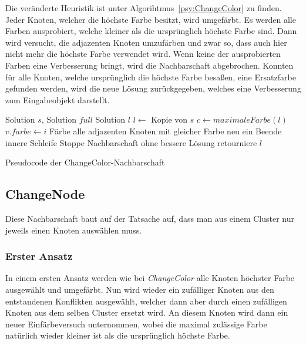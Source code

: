 Die veränderte Heuristik ist unter Algorihtmus~\ref{psy:ChangeColor} zu finden. Jeder Knoten, welcher die höchste Farbe besitzt, wird umgefärbt. Es werden alle Farben ausprobiert, welche kleiner als
die ursprünglich höchste Farbe sind. Dann wird versucht, die adjazenten Knoten umzufärben und zwar so, dass auch hier nicht mehr die höchste Farbe verwendet wird. Wenn keine der ausprobierten Farben eine
Verbesserung bringt, wird die Nachbarschaft abgebrochen. Konnten für alle Knoten, welche ursprünglich die höchste Farbe besaßen, eine Ersatzfarbe gefunden werden, wird die neue Lösung zurückgegeben, 
welches eine Verbesserung zum Eingabeobjekt darstellt.

\begin{algorithm}
\begin{algorithmic}[1]
\Require Solution $s$, Solution $full$
\Ensure Solution $l$
\State $l \leftarrow$ Kopie von $s$
\State $c \leftarrow maximaleFarbe(l)$
\State $v.farbe \leftarrow i$
\State Färbe alle adjazenten Knoten mit gleicher Farbe neu ein
\State Beende innere Schleife  
\EndIf
\EndFor
{}
\State Stoppe Nachbarschaft ohne bessere Lösung
\EndIf
\EndFor
\State retourniere $l$
\end{algorithmic}
\caption{Pseudocode der ChangeColor-Nachbarschaft}
\label{psy:ChangeColor}
\end{algorithm}

\subsection{ChangeNode}
\label{sec:changenode}
Diese Nachbarschaft baut auf der Tatsache auf, dass man aus einem Cluster nur jeweils einen Knoten auswählen muss. 

\subsubsection{Erster Ansatz}

In einem ersten Ansatz werden wie bei \emph{ChangeColor} alle Knoten höchster Farbe ausgewählt und umgefärbt.
Nun wird wieder ein zufälliger Knoten aus den entstandenen Konflikten ausgewählt, welcher dann aber durch einen zufälligen Knoten aus dem selben Cluster ersetzt wird. An diesem Knoten wird dann ein neuer Einfärbeversuch unternommen, wobei die maximal zulässige Farbe natürlich wieder kleiner ist als die ursprünglich höchste Farbe.

